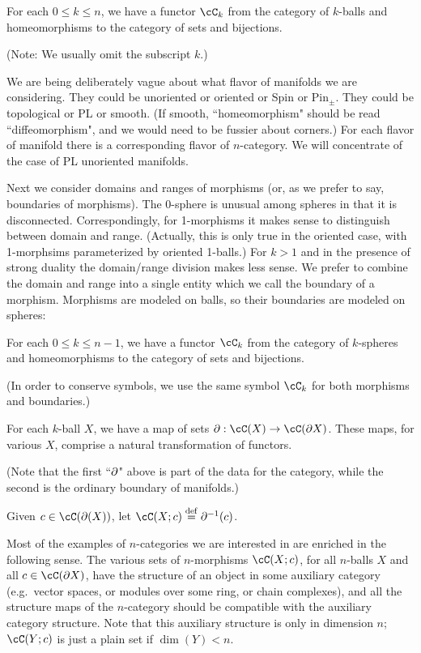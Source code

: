 {For each $0 \le k \le n$, we have a functor $\cC_k$ from 
the category of $k$-balls and 
homeomorphisms to the category of sets and bijections.}

(Note: We usually omit the subscript $k$.)

We are being deliberately vague about what flavor of manifolds we are considering.
They could be unoriented or oriented or Spin or $\mbox{Pin}_\pm$.
They could be topological or PL or smooth.
(If smooth, ``homeomorphism" should be read ``diffeomorphism", and we would need
to be fussier about corners.)
For each flavor of manifold there is a corresponding flavor of $n$-category.
We will concentrate of the case of PL unoriented manifolds.

Next we consider domains and ranges of morphisms (or, as we prefer to say, boundaries
of morphisms).
The 0-sphere is unusual among spheres in that it is disconnected.
Correspondingly, for 1-morphisms it makes sense to distinguish between domain and range.
(Actually, this is only true in the oriented case, with 1-morphsims parameterized
by oriented 1-balls.)
For $k>1$ and in the presence of strong duality the domain/range division makes less sense.
We prefer to combine the domain and range into a single entity which we call the 
boundary of a morphism.
Morphisms are modeled on balls, so their boundaries are modeled on spheres:

{For each $0 \le k \le n-1$, we have a functor $\cC_k$ from 
the category of $k$-spheres and 
homeomorphisms to the category of sets and bijections.}

(In order to conserve symbols, we use the same symbol $\cC_k$ for both morphisms and boundaries.)

{For each $k$-ball $X$, we have a map of sets $\bd: \cC(X)\to \cC(\bd X)$.
These maps, for various $X$, comprise a natural transformation of functors.}

(Note that the first ``$\partial$" above is part of the data for the category, 
while the second is the ordinary boundary of manifolds.)

Given $c\in\cC(\bd(X))$, let $\cC(X; c) \deq \bd^{-1}(c)$.

Most of the examples of $n$-categories we are interested in are enriched in the following sense.
The various sets of $n$-morphisms $\cC(X; c)$, for all $n$-balls $X$ and
all $c\in \cC(\bd X)$, have the structure of an object in some auxiliary category
(e.g.\ vector spaces, or modules over some ring, or chain complexes),
and all the structure maps of the $n$-category should be compatible with the auxiliary
category structure.
Note that this auxiliary structure is only in dimension $n$;
$\cC(Y; c)$ is just a plain set if $\dim(Y) < n$.

